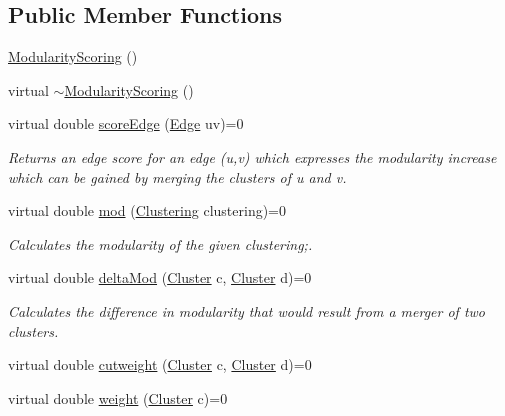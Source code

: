 \subsection*{Public Member Functions}
\begin{DoxyCompactItemize}
\item 
\hyperlink{class_ensemble_clustering_1_1_modularity_scoring_afc43c6855a0ab865fc55d184d479a3d0}{Modularity\-Scoring} ()
\item 
virtual \hyperlink{class_ensemble_clustering_1_1_modularity_scoring_a4ef0138b4df5b5e4cfd787a55bd89862}{$\sim$\-Modularity\-Scoring} ()
\item 
virtual double \hyperlink{class_ensemble_clustering_1_1_modularity_scoring_abf09f85a7a028727888ab767d7cd7bcf}{score\-Edge} (\hyperlink{namespace_ensemble_clustering_abb5f21f23a27c13de604d6ff457ac94b}{Edge} uv)=0
\begin{DoxyCompactList}\small\item\em Returns an edge score for an edge (u,v) which expresses the modularity increase which can be gained by merging the clusters of u and v. \end{DoxyCompactList}\item 
virtual double \hyperlink{class_ensemble_clustering_1_1_modularity_scoring_a2eeb581ed35b9dbf8488824588f72b57}{mod} (\hyperlink{class_ensemble_clustering_1_1_clustering}{Clustering} clustering)=0
\begin{DoxyCompactList}\small\item\em Calculates the modularity of the given clustering;. \end{DoxyCompactList}\item 
virtual double \hyperlink{class_ensemble_clustering_1_1_modularity_scoring_a3c3d64dafd04e3d1b6a2dae6db7ef5dd}{delta\-Mod} (\hyperlink{namespace_ensemble_clustering_a8d9740fbc7cc7696652cd8b6974121ac}{Cluster} c, \hyperlink{namespace_ensemble_clustering_a8d9740fbc7cc7696652cd8b6974121ac}{Cluster} d)=0
\begin{DoxyCompactList}\small\item\em Calculates the difference in modularity that would result from a merger of two clusters. \end{DoxyCompactList}\item 
virtual double \hyperlink{class_ensemble_clustering_1_1_modularity_scoring_a58f3949c9e11e26d6935ddcca8946cf0}{cutweight} (\hyperlink{namespace_ensemble_clustering_a8d9740fbc7cc7696652cd8b6974121ac}{Cluster} c, \hyperlink{namespace_ensemble_clustering_a8d9740fbc7cc7696652cd8b6974121ac}{Cluster} d)=0
\item 
virtual double \hyperlink{class_ensemble_clustering_1_1_modularity_scoring_ae8e025cec5c6c45154967889e5825626}{weight} (\hyperlink{namespace_ensemble_clustering_a8d9740fbc7cc7696652cd8b6974121ac}{Cluster} c)=0
\end{DoxyCompactItemize}


